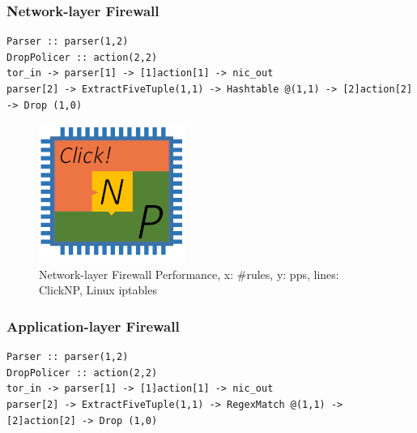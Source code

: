 {\subsubsection{Network-layer Firewall}

\begin{lstlisting}
Parser :: parser(1,2)
DropPolicer :: action(2,2)
tor_in -> parser[1] -> [1]action[1] -> nic_out
parser[2] -> ExtractFiveTuple(1,1) -> Hashtable @(1,1) -> [2]action[2] -> Drop (1,0)
\end{lstlisting}

\begin{figure}[h!]
	\centering
	\includegraphics[width=0.6\columnwidth]{image/logo}
	\vspace{-0.15in}
	\caption{Network-layer Firewall Performance, x: \#rules, y: pps, lines: ClickNP, Linux iptables}
	\vspace{-0.15in}
	\label{fig:FirewallPerformance}
\end{figure}

\subsubsection{Application-layer Firewall}

\begin{lstlisting}
Parser :: parser(1,2)
DropPolicer :: action(2,2)
tor_in -> parser[1] -> [1]action[1] -> nic_out
parser[2] -> ExtractFiveTuple(1,1) -> RegexMatch @(1,1) -> [2]action[2] -> Drop (1,0)
\end{lstlisting}

}
